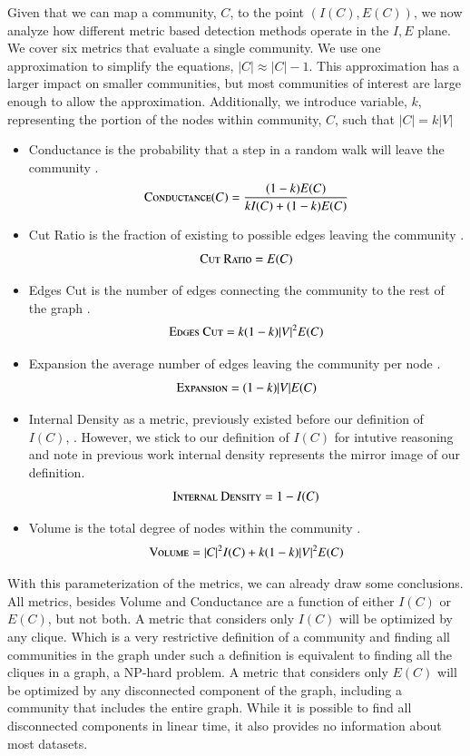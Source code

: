 \documentclass[phd,tocprelim]{cornell}
\begin{document}
Given that we can map a community, $C$, to the point $(I(C), E(C))$, we now analyze how different metric based detection methods operate in the $I,E$ plane.  We cover six metrics that evaluate a single community.  We use one approximation to simplify the equations, $|C| \approx |C| - 1$.  This approximation has a larger impact on smaller communities, but most communities of interest are large enough to allow the approximation.  Additionally, we introduce variable, $k$, representing the portion of the nodes within community, $C$, such that $|C| = k |V|$
\begin{itemize}
\item {\sc Conductance} is the probability that a step in a random walk will leave the community \cite{JTODO}.
\begin{equation}
\mbox{\sc Conductance}(C) = \frac{(1 - k)E(C)}{kI(C) + (1 - k)E(C)}
\end{equation}
\item {\sc Cut Ratio} is the fraction of existing to possible edges leaving the community \cite{JTODO}.
\begin{equation}
\mbox{\sc Cut Ratio} = E(C)
\end{equation}
\item {\sc Edges Cut} is the number of edges connecting the community to the rest of the graph \cite{JTODO}.\begin{equation}
\mbox{\sc Edges Cut} = k (1-k) |V|^2 E(C)
\end{equation}
\item {\sc Expansion} the average number of edges leaving the community per node \cite{JTODO}.
\begin{equation}
\mbox{\sc Expansion} = (1 - k)|V |E(C)
\end{equation}
\item {\sc Internal Density} as a metric, previously existed before our definition of $I(C)$, \cite{JTODO}.  However, we stick to our definition of $I(C)$ for intutive reasoning and note in previous work internal density represents the mirror image of our definition.
\begin{equation}
\mbox{\sc Internal Density} = 1 - I(C)
\end{equation}
\item {\sc Volume} is the total degree of nodes within the community \cite{JTODO}.
\begin{equation}
\mbox{\sc Volume} = |C|^2 I(C) + k(1-k)|V|^2E(C)
\end{equation}
\end{itemize}
 With this parameterization of the metrics, we can already draw some conclusions.  All metrics, besides {\sc Volume} and {\sc Conductance} are a function of either $I(C)$ or $E(C)$, but not both.  A metric that considers only $I(C)$ will be optimized by any clique.  Which is a very restrictive definition of a community and finding all communities in the graph under such a definition is equivalent to finding all the cliques in a graph, a NP-hard problem.  A metric that considers only $E(C)$ will be optimized by any disconnected component of the graph, including a community that includes the entire graph.  While it is possible to find all disconnected components in linear time, it also provides no information about most datasets.
\end{document}
